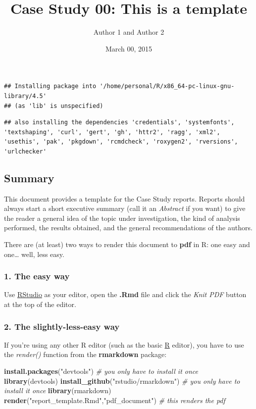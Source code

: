 \documentclass[
]{article}
\title{Case Study 00: This is a template}
\author{Author 1 and Author 2}
\date{March 00, 2015}
\newenvironment{Shaded}{\begin{snugshade}}{\end{snugshade}}
\newcommand{\CommentTok}[1]{\textcolor[rgb]{0.56,0.35,0.01}{\textit{#1}}}
\newcommand{\FunctionTok}[1]{\textcolor[rgb]{0.13,0.29,0.53}{\textbf{#1}}}
\newcommand{\NormalTok}[1]{#1}
\newcommand{\StringTok}[1]{\textcolor[rgb]{0.31,0.60,0.02}{#1}}
\begin{document}
\maketitle

\begin{verbatim}
## Installing package into '/home/personal/R/x86_64-pc-linux-gnu-library/4.5'
## (as 'lib' is unspecified)
\end{verbatim}

\begin{verbatim}
## also installing the dependencies 'credentials', 'systemfonts', 'textshaping', 'curl', 'gert', 'gh', 'httr2', 'ragg', 'xml2', 'usethis', 'pak', 'pkgdown', 'rcmdcheck', 'roxygen2', 'rversions', 'urlchecker'
\end{verbatim}

\subsection{Summary}\label{summary}

This document provides a template for the Case Study reports. Reports
should always start a short executive summary (call it an
\emph{Abstract} if you want) to give the reader a general idea of the
topic under investigation, the kind of analysis performed, the results
obtained, and the general recommendations of the authors.

There are (at least) two ways to render this document to \textbf{pdf} in
R: one easy and one\ldots{} well, less easy.

\subsubsection{1. The easy way}\label{the-easy-way}

Use \href{http://rstudio.com/}{RStudio} as your editor, open the
\textbf{.Rmd} file and click the \emph{Knit PDF} button at the top of
the editor.

\subsubsection{2. The slightly-less-easy
way}\label{the-slightly-less-easy-way}

If you're using any other R editor (such as the basic
\href{http://cran.r-project.org}{R} editor), you have to use the
\emph{render()} function from the \textbf{rmarkdown} package:

\begin{Shaded}
\begin{Highlighting}[]
\FunctionTok{install.packages}\NormalTok{(}\StringTok{"devtools"}\NormalTok{)                    }\CommentTok{\# you only have to install it once}
\FunctionTok{library}\NormalTok{(devtools)}
\FunctionTok{install\_github}\NormalTok{(}\StringTok{"rstudio/rmarkdown"}\NormalTok{)             }\CommentTok{\# you only have to install it once}
\FunctionTok{library}\NormalTok{(rmarkdown)}
\FunctionTok{render}\NormalTok{(}\StringTok{"report\_template.Rmd"}\NormalTok{,}\StringTok{"pdf\_document"}\NormalTok{)    }\CommentTok{\# this renders the pdf}
\end{Highlighting}
\end{Shaded}
\end{document}
